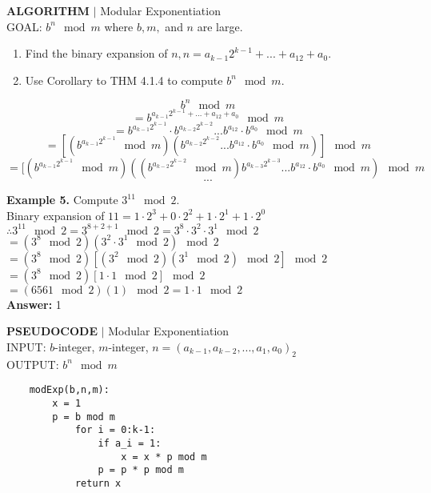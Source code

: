 \documentclass [12pt]{article}
\begin{document}
\begin{framed}
\noindent\textbf{ALGORITHM} $|$ Modular Exponentiation\\
GOAL: $b^n\mod m$ where $b,m,$ and $n$ are large.
\begin{enumerate}[\quad1.]
    \item Find the binary expansion of $n,n=a_{k-1}2^{k-1}+...+a_12+a_0$.
    \item Use Corollary to THM 4.1.4 to compute $b^n \mod m$.
\end{enumerate}
\[b^n \mod m\]
\[=b^{a_{k-1}2^{k-1}+...+a_12+a_0}\mod m\]
\[=b^{a_{k-1}2^{k-1}}\cdot  b^{a_{k-2}2^{k-2}}...b^{a_12}\cdot b^{a_0}\mod m\]
\[=[(b^{a_{k-1}2^{k-1}} \mod m)(b^{a_{k-2}2^{k-2}}...b^{a_12}\cdot b^{a_0}\mod m)]\mod m\]
\[=[(b^{a_{k-1}2^{k-1}} \mod m)((b^{a_{k-2}2^{k-2}} \mod m)b^{a_{k-3}2^{k-3}}...b^{a_12}\cdot b^{a_0}\mod m)\mod m\]
\[...\]
\end{framed}
\noindent\textbf{Example 5.} Compute $3^{11}\mod2$.\\
Binary expansion of $11 = 1\cdot2^3+0\cdot2^2+1\cdot2^1+1\cdot2^0$\\
$\therefore 3^{11} \mod 2= 3^{8+2+1} \mod2 = 3^8\cdot3^2\cdot3^1\mod2$\\
$=(3^8\mod2)(3^2\cdot3^1\mod2)\mod2$\\
$=(3^8\mod2)[(3^2\mod2)(3^1\mod2)\mod2]\mod2$\\
$=(3^8\mod2)[1\cdot1\mod2]\mod2$\\
$=(6561\mod2)(1)\mod2=1\cdot1\mod2$\\
\textbf{Answer:} 1

\begin{framed}
\noindent\textbf{PSEUDOCODE} $|$ Modular Exponentiation\\
INPUT: $b$-integer, $m$-integer, $n=(a_{k-1},a_{k-2},...,a_1,a_0)_2$\\
OUTPUT: $b^n\mod m$\\
\begin{lstlisting}
    modExp(b,n,m):
        x = 1
        p = b mod m
            for i = 0:k-1:
                if a_i = 1:
                    x = x * p mod m
                p = p * p mod m
            return x
\end{lstlisting}
\end{framed}
\end{document}
